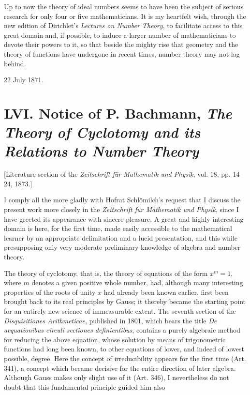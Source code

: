 \documentclass[11pt]{article}
\newcommand{\origpage}[1]{\par\vspace{0.25em}\noindent{\footnotesize\itshape [Printed page #1]}\par\vspace{0.25em}}
\begin{document}
Up to now the theory of ideal numbers seems to have been the subject of serious research for only four or five mathematicians. It is my heartfelt wish, through the new edition of Dirichlet's \textit{Lectures on Number Theory}, to facilitate access to this great domain and, if possible, to induce a larger number of mathematicians to devote their powers to it, so that beside the mighty rise that geometry and the theory of functions have undergone in recent times, number theory may not lag behind.

\begin{flushright}22 July 1871.\end{flushright}



\origpage{408}
\section*{LVI. Notice of P. Bachmann, \textit{The Theory of Cyclotomy and its Relations to Number Theory}}
\begin{center}\small [Literature section of the \textit{Zeitschrift für Mathematik und Physik}, vol. 18, pp. 14--24, 1873.]\end{center}

I comply all the more gladly with Hofrat Schlömilch's request that I discuss the present work more closely in the \textit{Zeitschrift für Mathematik und Physik}, since I have greeted its appearance with sincere pleasure. A great and highly interesting domain is here, for the first time, made easily accessible to the mathematical learner by an appropriate delimitation and a lucid presentation, and this while presupposing only very moderate preliminary knowledge of algebra and number theory.

The theory of cyclotomy, that is, the theory of equations of the form $x^m=1$, where $m$ denotes a given positive whole number, had, although many interesting properties of the roots of unity $x$ had already been known earlier, first been brought back to its real principles by Gauss; it thereby became the starting point for an entirely new science of immeasurable extent. The seventh section of the \textit{Disquisitiones Arithmeticae}, published in 1801, which bears the title \textit{De aequationibus circuli sectiones definientibus}, contains a purely algebraic method for reducing the above equation, whose solution by means of trigonometric functions had long been known, to other equations of lower, and indeed of lowest possible, degree. Here the concept of irreducibility appears for the first time (Art. 341), a concept which became decisive for the entire direction of later algebra. Although Gauss makes only slight use of it (Art. 346), I nevertheless do not doubt that this fundamental principle guided him also
\end{document}
